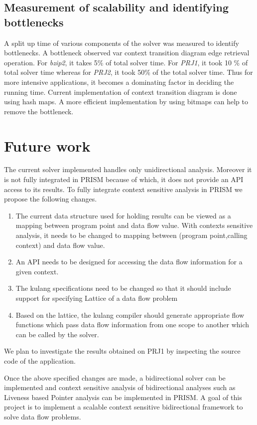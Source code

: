 \documentclass[12pt]{report}
\begin{document}
\section{Measurement of scalability and identifying bottlenecks}

A split up time of various components of the solver was measured to identify bottlenecks. A bottleneck observed var context transition diagram edge retrieval operation. For \emph{bzip2}, it takes 5\% of total solver time. For \emph{PRJ1}, it took 10 \% of total solver time whereas for \emph{PRJ2}, it took 50\% of the total solver time. Thus for more intensive applications, it becomes a dominating factor in deciding the running time. Current implementation of context transition diagram is done using hash maps. A more efficient implementation by using bitmaps can help to remove the bottleneck.
\newpage
\chapter{Future work}

The current solver implemented handles only unidirectional analysis. Moreover it is not fully integrated in PRISM because of which, it does not provide an API access to its results. To fully integrate context sensitive analysis in PRISM we propose the following changes.

\begin{enumerate}
\item The current data structure used for holding results can be viewed as a mapping between program point and data flow value. With contexts sensitive analysis, it needs to be changed to mapping between (program point,calling context) and data flow value.
\item An API needs to be designed for accessing the data flow information for a given context.
\item The kulang specifications need to be changed so that it should include support for specifying Lattice of a data flow problem
\item Based on the lattice, the kulang compiler should generate appropriate flow functions which pass data flow information from one scope to another which can be called by the solver.
\end{enumerate}


We plan to investigate the results obtained on PRJ1 by inspecting the source code of the application.

Once the above specified changes are made, a bidirectional solver can be implemented and context sensitive analysis of bidirectional analyses such as Liveness based Pointer analysis can be implemented in PRISM. A goal of this project is to implement a scalable context sensitive bidirectional framework to solve data flow problems.
\end{document}
